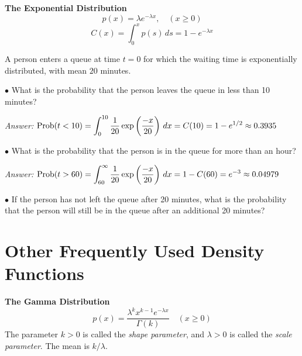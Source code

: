 \medskip
\noindent
\textbf{The Exponential Distribution}
\begin{equation}
 p(x) = \lambda e^{-\lambda x}, \quad (x \ge 0)
\end{equation}
\begin{equation}
  C(x) = \int_0^x p(s)\,ds =  1 - e^{-\lambda x}
\end{equation}
\begin{xexample}
A person enters a queue at time $t=0$ for which the
waiting time is exponentially distributed, with mean $20$ minutes.

\noindent
$\bullet$
 What is the probability that the person leaves the
queue in less than 10 minutes?

\noindent
\emph{Answer:} $\displaystyle \textrm{Prob}(t < 10) =\int_0^{10} \frac{1}{20} \exp\left(\frac{-x}{20}\right)\,dx
     = C(10) = 1-e^{1/2} \approx 0.3935$

\noindent
$\bullet$
What is the probability that the person is in the queue for
more than an hour?

\noindent
\emph{Answer:} $\displaystyle \textrm{Prob}(t > 60) = \int_{60}^{\infty} \frac{1}{20} \exp\left(\frac{-x}{20}\right)\,dx
     = 1-C(60) = e^{-3} \approx 0.04979$

\noindent
$\bullet$
If the person has not left the queue after 20 minutes, what is the
probability that the person will still be in the queue after an additional
20 minutes?
\label{ex:exp_example}
\end{xexample}
%
\section{Other Frequently Used Density Functions}
%
\noindent
\textbf{The Gamma Distribution}
\begin{equation}
  p(x) = \frac{\lambda^{k} x^{k-1} e^{-\lambda x}}{\Gamma(k)}
   \quad (x \ge 0)
\end{equation}
The parameter $k>0$ is called the \emph{shape parameter},
and $\lambda > 0$ is called the \emph{scale parameter}.
The mean is $k/\lambda$.

